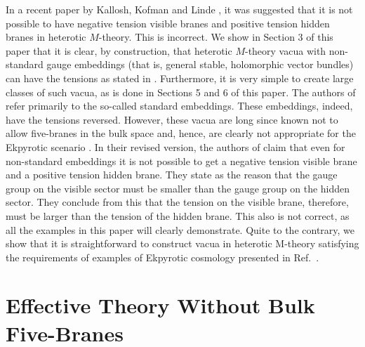 \documentclass[a4paper,12pt]{article}
\numberwithin{equation}{section}
\theoremstyle{plain}
\begin{document}
In a recent paper by Kallosh, Kofman and Linde \cite{KKL}, it was suggested that 
it is not possible to have negative
tension visible branes and positive tension hidden branes in heterotic
$M$-theory. This is incorrect. We show in Section 3 of this paper that it is
clear,
by construction, that heterotic $M$-theory vacua with non-standard gauge embeddings
(that is, general stable, holomorphic vector bundles) can have the
tensions as stated in \cite{EU}. Furthermore, it is very simple
to create large classes of such vacua, as is done in Sections 5 and 6 of
this paper. The authors
of \cite{KKL} refer primarily to the so-called standard embeddings. 
These embeddings, indeed, have
the tensions reversed. However, these vacua are long since known not to allow
five-branes in the bulk space and, hence, are clearly not appropriate for the 
Ekpyrotic scenario \cite{EU}. In their revised version, the authors of
\cite{KKL} claim that even for non-standard embeddings it is not
possible to get a negative tension visible brane and a positive tension hidden
brane. They state as the reason that the gauge group on the visible sector
must be smaller than the gauge group on the hidden sector. They conclude from
this that the tension on the visible brane, therefore, must be larger than the
tension of the hidden brane. This also is not correct, as all the examples in
this paper will clearly demonstrate. Quite to the contrary, 
we show that it is straightforward 
to construct vacua in heterotic M-theory satisfying the requirements of 
examples of Ekpyrotic cosmology presented in Ref.~\cite{EU}. 

\section{Effective Theory Without Bulk Five-Branes}
\end{document}
